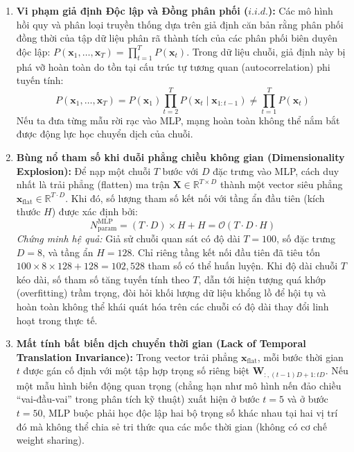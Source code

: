 \documentclass[12pt,a4paper]{report}
\begin{document}
\begin{enumerate}
    \item \textbf{Vi phạm giả định Độc lập và Đồng phân phối ($i.i.d.$):} Các mô hình hồi quy và phân loại truyền thống dựa trên giả định căn bản rằng phân phối đồng thời của tập dữ liệu phân rã thành tích của các phân phối biên duyên độc lập: $P(\mathbf{x}_1, \dots, \mathbf{x}_T) = \prod_{t=1}^T P(\mathbf{x}_t)$. Trong dữ liệu chuỗi, giả định này bị phá vỡ hoàn toàn do tồn tại cấu trúc tự tương quan (autocorrelation) phi tuyến tính:
    \begin{equation}
        P(\mathbf{x}_1, \dots, \mathbf{x}_T) = P(\mathbf{x}_1) \prod_{t=2}^T P(\mathbf{x}_t \mid \mathbf{x}_{1:t-1}) \neq \prod_{t=1}^T P(\mathbf{x}_t)
    \end{equation}
    Nếu ta đưa từng mẫu rời rạc vào MLP, mạng hoàn toàn không thể nắm bắt được động lực học chuyển dịch của chuỗi.
    \item \textbf{Bùng nổ tham số khi duỗi phẳng chiều không gian (Dimensionality Explosion):} Để nạp một chuỗi $T$ bước với $D$ đặc trưng vào MLP, cách duy nhất là trải phẳng (flatten) ma trận $\mathbf{X} \in \mathbb{R}^{T \times D}$ thành một vector siêu phẳng $\mathbf{x}_{\text{flat}} \in \mathbb{R}^{T \cdot D}$. Khi đó, số lượng tham số kết nối với tầng ẩn đầu tiên (kích thước $H$) được xác định bởi:
    \begin{equation}
        N_{\text{param}}^{\text{MLP}} = (T \cdot D) \times H + H = \mathcal{O}(T \cdot D \cdot H)
    \end{equation}
    \textit{Chứng minh hệ quả:} Giả sử chuỗi quan sát có độ dài $T = 100$, số đặc trưng $D = 8$, và tầng ẩn $H = 128$. Chỉ riêng tầng kết nối đầu tiên đã tiêu tốn $100 \times 8 \times 128 + 128 = 102,528$ tham số có thể huấn luyện. Khi độ dài chuỗi $T$ kéo dài, số tham số tăng tuyến tính theo $T$, dẫn tới hiện tượng quá khớp (overfitting) trầm trọng, đòi hỏi khối lượng dữ liệu khổng lồ để hội tụ và hoàn toàn không thể khái quát hóa trên các chuỗi có độ dài thay đổi linh hoạt trong thực tế.
    \item \textbf{Mất tính bất biến dịch chuyển thời gian (Lack of Temporal Translation Invariance):} Trong vector trải phẳng $\mathbf{x}_{\text{flat}}$, mỗi bước thời gian $t$ được gán cố định với một tập hợp trọng số riêng biệt $\mathbf{W}_{:, (t-1)D+1 : tD}$. Nếu một mẫu hình biến động quan trọng (chẳng hạn như mô hình nến đảo chiều “vai-đầu-vai” trong phân tích kỹ thuật) xuất hiện ở bước $t=5$ và ở bước $t=50$, MLP buộc phải học độc lập hai bộ trọng số khác nhau tại hai vị trí đó mà không thể chia sẻ tri thức qua các mốc thời gian (không có cơ chế weight sharing).
\end{enumerate}
\end{document}
